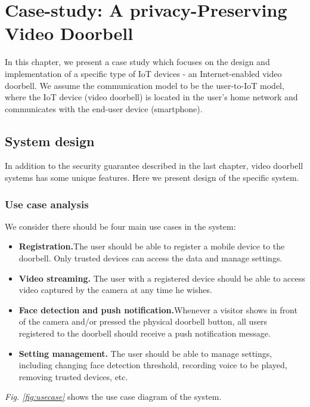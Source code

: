 \chapter{Case-study: A privacy-Preserving Video Doorbell}

In this chapter, we present a case study which focuses on the design and implementation of a specific type of IoT devices - an Internet-enabled video doorbell. We assume the communication model to be the user-to-IoT model, where the IoT device (video doorbell) is located in the user's home network and communicates with the end-user device (smartphone).

\section{System design}
In addition to the security guarantee described in the last chapter, video doorbell systems has some unique features. Here we present design of the specific system.

\subsection{Use case analysis}
We consider there should be four main use cases in the system:
\begin{itemize}
	\item \textbf{Registration.}The user should be able to register a mobile device to the doorbell. Only trusted devices can access the data and manage settings.
	\item \textbf{Video streaming.} The user with a registered device should be able to access video captured by the camera at any time he wishes.
	\item \textbf{Face detection and push notification.}Whenever a visitor shows in front of the camera and/or pressed the physical doorbell button, all users registered to the doorbell should receive a push notification message.
	\item \textbf{Setting management.} The user should be able to manage settings, including changing face detection threshold, recording voice to be played, removing trusted devices, etc.
\end{itemize}

\textit{Fig. \ref{fig:usecase}} shows the use case diagram of the system.

